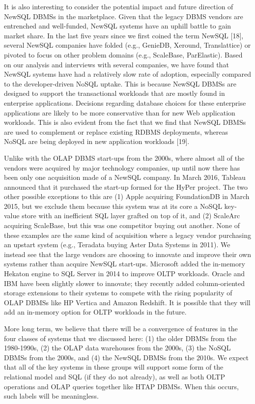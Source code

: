 \documentclass[a4paper,12pt,notitlepage,twoside,openright]{article}
\begin{document}
It is also interesting to consider the potential impact and future
direction of NewSQL DBMSs in the marketplace. Given that the legacy DBMS
vendors are entrenched and well-funded, NewSQL systems have an uphill
battle to gain market share. In the last five years since we first
coined the term NewSQL {[}18{]}, several NewSQL companies have folded
(e.g., GenieDB, Xeround, Translattice) or pivoted to focus on other
problem domains (e.g., ScaleBase, ParElastic). Based on our analysis and
interviews with several companies, we have found that NewSQL systems
have had a relatively slow rate of adoption, especially compared to the
developer-driven NoSQL uptake. This is because NewSQL DBMSs are designed
to support the transactional workloads that are mostly found in
enterprise applications. Decisions regarding database choices for these
enterprise applications are likely to be more conservative than for new
Web application workloads. This is also evident from the fact that we
find that NewSQL DBMSs are used to complement or replace existing RDBMS
deployments, whereas
NoSQL are being deployed in new application workloads {[}19{]}.

Unlike with the OLAP DBMS start-ups from the 2000s, where almost all of
the vendors were acquired by major technology companies, up until now
there has been only one acquisition made of a NewSQL company. In March
2016, Tableau announced that it purchased the start-up formed for the
HyPer project. The two other possible exceptions to this are (1) Apple
acquiring FoundationDB in March 2015, but we exclude them because this
system was at its core a NoSQL key-value store with an inefficient SQL
layer grafted on top of it, and (2) ScaleArc acquiring ScaleBase, but
this was one competitor buying out another. None of these examples are
the same kind of acquisition where a legacy vendor purchasing an upstart
system (e.g., Teradata buying Aster Data Systems in 2011). We instead
see that the large vendors are choosing to innovate and improve their
own systems rather than acquire NewSQL start-ups. Microsoft added the
in-memory Hekaton engine to SQL Server in 2014 to improve OLTP
workloads. Oracle and IBM have been slightly slower to innovate; they
recently added column-oriented storage extensions to their systems to
compete with the rising popularity of OLAP DBMSs like HP Vertica and
Amazon Redshift. It is possible that they will add an in-memory option
for OLTP workloads in the future.

More long term, we believe that there will be a convergence of features
in the four classes of systems that we discussed here: (1) the older
DBMSs from the 1980-1990s, (2) the OLAP data warehouses from the 2000s,
(3) the NoSQL DBMSs from the 2000s, and (4) the NewSQL DBMSs from the
2010s. We expect that all of the key systems in these groups will
support some form of the relational model and SQL (if they do not
already), as well as both OLTP operations and OLAP queries together like
HTAP DBMSs. When this occurs, such labels will be meaningless.
\end{document}
